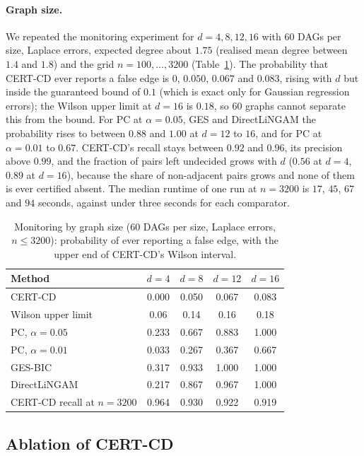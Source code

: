\paragraph{Graph size.} We repeated the monitoring experiment for
$d=4,8,12,16$ with $60$ DAGs per size, Laplace errors, expected degree about
$1.75$ (realised mean degree between $1.4$ and $1.8$) and the grid $n=100,\dots,3200$ (Table~\ref{tab:scaling}). The
probability that CERT-CD ever reports a false edge is $0$, $0.050$, $0.067$ and
$0.083$, rising with $d$ but inside the guaranteed bound of $0.1$ (which is exact
only for Gaussian regression errors); the Wilson upper limit at $d=16$ is
$0.18$, so $60$ graphs cannot separate this from the bound. For PC at
$\alpha=0.05$, GES and DirectLiNGAM the probability rises to between $0.88$ and
$1.00$ at $d=12$ to $16$, and for PC at $\alpha=0.01$ to $0.67$. CERT-CD's recall
stays between $0.92$ and $0.96$, its precision above $0.99$, and the fraction
of pairs left undecided grows with $d$ ($0.56$ at $d=4$, $0.89$ at $d=16$),
because the share of non-adjacent pairs grows and none of them is ever
certified absent. The median runtime of one run at $n=3200$ is $17$, $45$, $67$
and $94$ seconds, against under three seconds for each comparator.

\begin{table}[t]
\caption{Monitoring by graph size ($60$ DAGs per size, Laplace errors,
$n\le3200$): probability of ever reporting a false edge, with the upper end of CERT-CD's
Wilson interval.}\label{tab:scaling}
\small
\scriptsize\setlength{\tabcolsep}{2pt}
\begin{tabular}{@{}lcccc@{}}
\toprule
Method & $d=4$ & $d=8$ & $d=12$ & $d=16$\\
\midrule
CERT-CD & 0.000 & 0.050 & 0.067 & 0.083\\
\quad Wilson upper limit & 0.06 & 0.14 & 0.16 & 0.18\\
PC, $\alpha=0.05$ & 0.233 & 0.667 & 0.883 & 1.000\\
PC, $\alpha=0.01$ & 0.033 & 0.267 & 0.367 & 0.667\\
GES-BIC & 0.317 & 0.933 & 1.000 & 1.000\\
DirectLiNGAM & 0.217 & 0.867 & 0.967 & 1.000\\
\midrule
CERT-CD recall at $n=3200$ & 0.964 & 0.930 & 0.922 & 0.919\\
\bottomrule
\end{tabular}
\end{table}

\subsection{Ablation of CERT-CD}\label{sec:exp-ablation}

